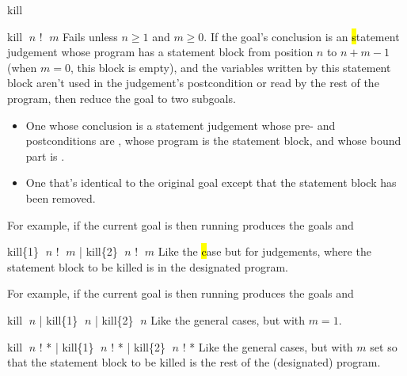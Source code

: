 \begin{tactic}{kill}
  \begin{tsyntax}{kill $\;n$ ! $\;m$}
    Fails unless $n\geq 1$ and $m\geq 0$.  If the goal's conclusion is
    an \hl statement judgement whose program has a statement block
    from position $n$ to $n + m - 1$ (when $m = 0$, this block is
    empty), and the variables written by this statement block aren't
    used in the judgement's postcondition or read by the rest of the
    program, then reduce the goal to two subgoals.
    \begin{itemize}
    \item One whose conclusion is a \phl statement judgement whose pre-
       and postconditions are , whose program is the
       statement block, and whose bound part is .

    \item One that's identical to the original goal except that the
      statement block has been removed.
    \end{itemize}

    \medskip For example, if the current goal is
     then
    running 
    produces the goals
    and
  \end{tsyntax}

  \begin{tsyntax}{kill\{1\} $\;n$ ! $\;m$ | kill\{2\} $\;n$ ! $\;m$}
    Like the \hl case but for \prhl judgements, where the statement
    block to be killed is in the designated program.

    \medskip For example, if the current goal is
     then
    running 
    produces the goals
    and
  \end{tsyntax}

  \begin{tsyntax}{kill $\;n$ | kill\{1\} $\;n$ | kill\{2\} $\;n$}
    Like the general cases, but with $m = 1$.
  \end{tsyntax}

  \begin{tsyntax}{kill $\;n$ ! * | kill\{1\} $\;n$ ! * | kill\{2\} $\;n$ ! *}
    Like the general cases, but with $m$ set so that the statement
    block to be killed is the rest of the (designated) program.
  \end{tsyntax}
\end{tactic}
